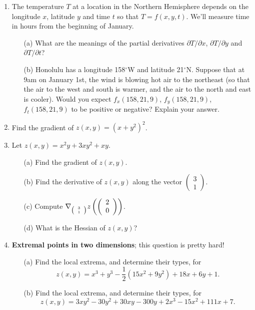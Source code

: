 \documentclass[11pt,a4paper]{scrartcl}
\begin{document}
\begin{enumerate}
\item The temperature $T$ at a location in the Northern Hemisphere depends on the longitude $x$, latitude $y$ and time $t$ so that $T = f(x,y,t)$. We'll measure time in hours from the beginning of January. 
\begin{enumerate}
    \item[(a)] What are the meanings of the partial derivatives $\partial T/\partial x$, $\partial T/\partial y$ and $\partial T/\partial t$?
    \item[(b)] Honolulu has a longitude 158$^\circ$W and latitude 21$^\circ$N. Suppose that at 9am on January 1st, the wind is blowing hot air to the northeast (so that the air to the west and south is warmer, and the air to the north and east is cooler). Would you expect $f_x(158,21,9)$, $f_y(158,21,9)$, $f_t(158,21,9)$ to be positive or negative? Explain your answer. 
\end{enumerate}
\item Find the gradient of $z(x,y)=(x+y^2)^2$.

\item Let $z(x,y) = x^2y + 3xy^2 + xy$.
	\begin{itemize}
		\item[(a)] Find the gradient of $z(x,y)$.
		\item[(b)] Find the derivative of $z(x,y)$ along the vector $\left(\begin{array}{c} 3 \\ 1 \end{array}\right).$
		\item[(c)] Compute $\nabla_{\tiny\left(\begin{array}{c} 3 \\ 1 \end{array}\right)} z \left(\left(\begin{array}{c} 2 \\ 0 \end{array}\right)\right)$.
                  \item[(d)] What is the Hessian of $z(x,y)$?
\end{itemize}

	
	\item \textbf{Extremal points in two dimensions}; this question is pretty hard!
	\begin{itemize}
		\item[(a)] Find the local extrema, and determine their types, for
		\[z(x,y) = x^3 + y^3 - \frac{1}{2}(15x^2 + 9y^2) + 18x + 6y + 1.\]
		\item[(b)] Find the local extrema, and determine their types, for
		\[z(x,y) = 3xy^2 - 30y^2 + 30xy - 300y + 2x^3 - 15x^2 + 111x + 7.\]
	\end{itemize}


\end{enumerate}
\end{document}
